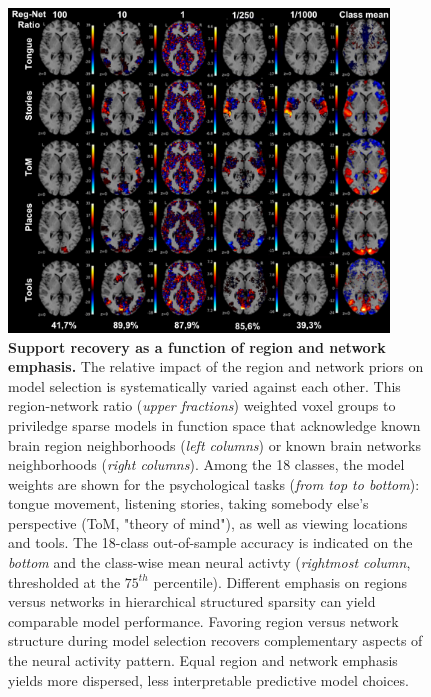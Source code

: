 \documentclass{article}
\begin{document}
\begin{figure}
\begin{centering}
\includegraphics[width=0.90\textwidth]{../figures/reg_net_ratio_colin.pdf}
\caption{\textbf{Support recovery as a function of
region and network emphasis.}
The relative impact of the region and network priors
on model selection
is systematically varied against each other.
This region-network ratio (\textit{upper fractions}) weighted voxel groups
to priviledge sparse models in function space
that acknowledge known brain region neighborhoods
(\textit{left columns}) or
known brain networks neighborhoods
(\textit{right columns}).
Among the 18 classes, the model weights are shown for the psychological
tasks (\textit{from top to bottom}): tongue movement, listening stories,
taking somebody else's perspective (ToM, "theory of mind"),
as well as
viewing locations and tools.
The 18-class out-of-sample accuracy is indicated
on the \textit{bottom} and
the class-wise mean neural activty
(\textit{rightmost column}, thresholded at the $75^{th}$ percentile).
%
Different emphasis on regions versus networks
in hierarchical structured sparsity can
yield comparable model performance.
%
Favoring region versus network structure during model selection
recovers complementary aspects of the neural activity pattern.
%
Equal region and network emphasis yields more dispersed,
less interpretable predictive model choices.
}
\label{fig_regnetratio}
\end{centering}
\end{figure}
%
\end{document}
